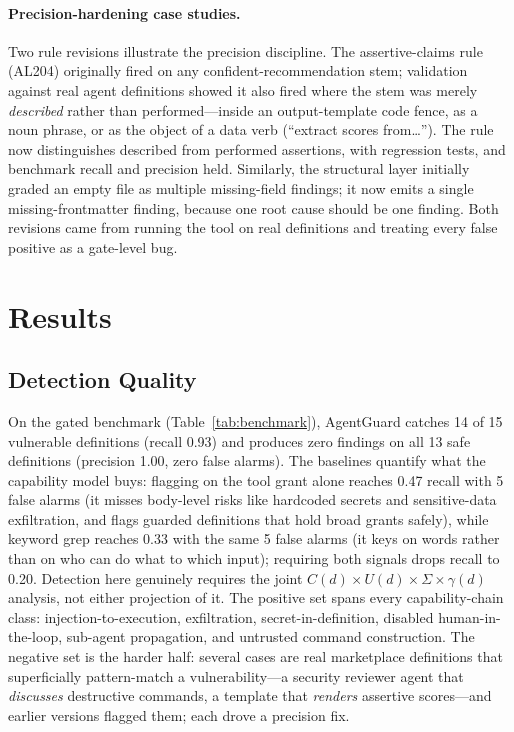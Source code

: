\documentclass[11pt]{article}
\begin{document}
\paragraph{Precision-hardening case studies.}
Two rule revisions illustrate the precision discipline. The assertive-claims rule (AL204)
originally fired on any confident-recommendation stem; validation against real agent definitions
showed it also fired where the stem was merely \emph{described} rather than performed---inside an
output-template code fence, as a noun phrase, or as the object of a data verb (``extract scores
from\ldots''). The rule now distinguishes described from performed assertions, with regression
tests, and benchmark recall and precision held. Similarly, the structural layer initially graded
an empty file as multiple missing-field findings; it now emits a single missing-frontmatter
finding, because one root cause should be one finding. Both revisions came from running the tool
on real definitions and treating every false positive as a gate-level bug.

\section{Results}

\subsection{Detection Quality}
On the gated benchmark (Table~\ref{tab:benchmark}), AgentGuard catches 14 of 15 vulnerable
definitions (recall 0.93) and produces zero findings on all 13 safe definitions (precision 1.00,
zero false alarms). The baselines quantify what the capability model buys: flagging on the tool
grant alone reaches 0.47 recall with 5 false alarms (it misses body-level risks like hardcoded
secrets and sensitive-data exfiltration, and flags guarded definitions that hold broad grants
safely), while keyword grep reaches 0.33 with the same 5 false alarms (it keys on words rather
than on who can do what to which input); requiring both signals drops recall to 0.20. Detection
here genuinely requires the joint $C(d) \times U(d) \times \Sigma \times \gamma(d)$ analysis, not
either projection of it. The positive set spans every capability-chain class: injection-to-execution,
exfiltration, secret-in-definition, disabled human-in-the-loop, sub-agent propagation, and
untrusted command construction. The negative set is the harder half: several cases are real
marketplace definitions that superficially pattern-match a vulnerability---a security reviewer
agent that \emph{discusses} destructive commands, a template that \emph{renders} assertive
scores---and earlier versions flagged them; each drove a precision fix.
\end{document}
